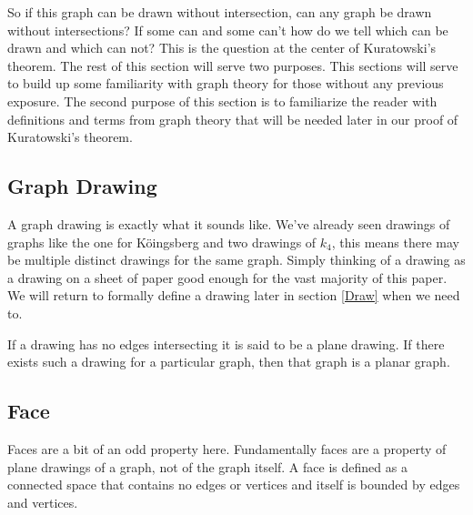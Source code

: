 \documentclass{article}
\begin{document}
So if this graph can be drawn without intersection, can any graph be drawn without intersections? If some can and some can't how do we tell which can be drawn and which can not? This is the question at the center of Kuratowski's theorem. The rest of this section will serve two purposes. This sections will serve to build up some familiarity with graph theory for those without any previous exposure. The second purpose of this section is to familiarize the reader with definitions and terms from graph theory that will be needed later in our proof of Kuratowski's theorem.

\subsection{Graph Drawing}
A graph drawing is exactly what it sounds like. We've already seen drawings of graphs like the one for K\"oingsberg and two drawings of $k_4$, this means there may be multiple distinct drawings for the same graph. Simply thinking of a drawing as a drawing on a sheet of paper good enough for the vast majority of this paper. We will return to formally define a drawing later in section \ref{Draw} when we need to.

If a drawing has no edges intersecting it is said to be a plane drawing. If there exists such a drawing for a particular graph, then that graph is a planar graph.

\subsection{Face}
Faces are a bit of an odd property here. Fundamentally faces are a property of plane drawings of a graph, not of the graph itself. A face is defined as a connected space that contains no edges or vertices and itself is bounded by edges and vertices.
\end{document}
